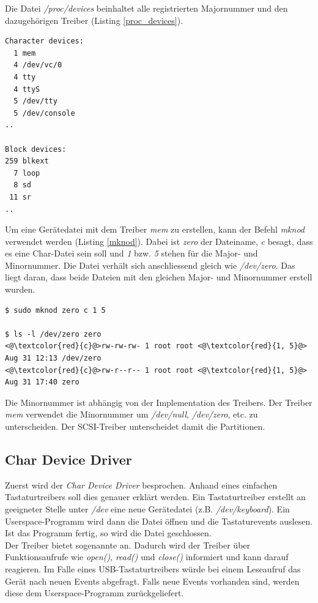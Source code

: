 Die Datei \emph{/proc/devices} beinhaltet alle registrierten Majornummer und den dazugehörigen Treiber (Listing \ref{proc_devices}).
\begin{lstlisting}[label=proc_devices,caption=/proc/devices]
Character devices:
  1 mem
  4 /dev/vc/0
  4 tty
  4 ttyS
  5 /dev/tty
  5 /dev/console
..

Block devices:
259 blkext
  7 loop
  8 sd
 11 sr
..
\end{lstlisting} \hfill

Um eine Gerätedatei mit dem Treiber \emph{mem} zu erstellen, kann der Befehl \emph{mknod} verwendet werden (Listing \ref{mknod}).
Dabei ist \emph{zero} der Dateiname, \emph{c} besagt, dass es eine Char-Datei sein soll und \emph{1} bzw. \emph{5} stehen für die Major- und Minornummer.
Die Datei verhält sich anschliessend gleich wie \emph{/dev/zero}. Das liegt daran, dass beide Dateien mit den gleichen Major- und Minornummer erstell wurden.
\begin{lstlisting}[label=mknod,caption=mknod]
$ sudo mknod zero c 1 5

$ ls -l /dev/zero zero
<@\textcolor{red}{c}@>rw-rw-rw- 1 root root <@\textcolor{red}{1, 5}@> Aug 31 12:13 /dev/zero
<@\textcolor{red}{c}@>rw-r--r-- 1 root root <@\textcolor{red}{1, 5}@> Aug 31 17:40 zero
\end{lstlisting} \hfill

Die Minornummer ist abhängig von der Implementation des Treibers. Der Treiber \emph{mem} verwendet die Minornummer um \emph{/dev/null}, \emph{/dev/zero}, etc. zu unterscheiden.
Der SCSI-Treiber unterscheidet damit die Partitionen.

\subsection{Char Device Driver}

Zuerst wird der \emph{Char Device Driver} besprochen. Anhand eines einfachen Tastaturtreibers soll dies genauer erklärt werden. Ein Tastaturtreiber erstellt an geeigneter
Stelle unter \emph{/dev} eine neue Gerätedatei (z.B. \emph{/dev/keyboard}). Ein Userspace-Programm wird dann die Datei öffnen und die Tastaturevents auslesen. Ist das 
Programm fertig, so wird die Datei geschlossen. \\

Der Treiber bietet sogenannte  an. Dadurch wird der Treiber über Funktionsaufrufe wie \emph{open()}, \emph{read()} und \emph{close()} informiert
und kann darauf reagieren. Im Falle eines USB-Tastaturtreibers würde bei einem Leseaufruf das Gerät nach neuen Events abgefragt. Falls neue Events vorhanden sind, werden diese dem Userspace-Programm
zurückgeliefert.

